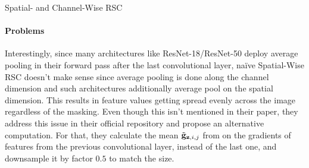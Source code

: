 \begin{algorithm}[t]
    \SetAlgoLined
    \SetNoFillComment
    \BlankLine
\caption{Spatial- and Channel-Wise RSC}
\label{alg:SpatialRSC}
\end{algorithm}


\paragraph{Problems}
Interestingly, since many architectures like ResNet-18/ResNet-50 deploy average pooling in their forward pass after the last convolutional layer, na\"ive Spatial-Wise RSC doesn't make sense since average pooling is done along the channel dimension and such architectures additionally average pool on the spatial dimension. This results in feature values getting spread evenly across the image regardless of the masking. Even though this isn't mentioned in their paper, they address this issue in their official repository and propose an alternative computation. For that, they calculate the mean $\Tilde{\mathbf{g}}_{\mathbf{z}, i, j}$ from  on the gradients of features from the previous convolutional layer, instead of the last one, and downsample it by factor $0.5$ to match the size.


